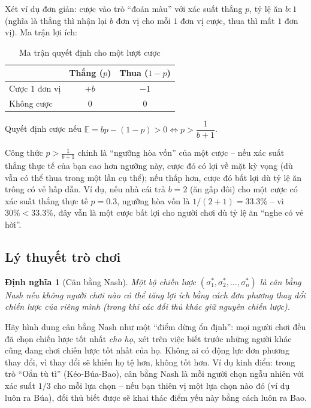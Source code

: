 \documentclass[12pt,a4paper]{article}
\theoremstyle{coloredthm}
\theoremstyle{coloreddef}
\newtheorem{definition}[theorem]{Định nghĩa}
\theoremstyle{remark}
\begin{document}
Xét ví dụ đơn giản: cược vào trò ``đoán màu'' với xác suất thắng $p$, tỷ lệ ăn $b:1$ (nghĩa là thắng thì nhận lại $b$ đơn vị cho mỗi $1$ đơn vị cược, thua thì mất $1$ đơn vị). Ma trận lợi ích:

\begin{table}[H]
\centering
\caption{Ma trận quyết định cho một lượt cược}
\begin{tabular}{lcc}
\toprule
 & \textbf{Thắng ($p$)} & \textbf{Thua ($1-p$)} \\
\midrule
Cược $1$ đơn vị & $+b$ & $-1$ \\
Không cược      & $0$  & $0$ \\
\bottomrule
\end{tabular}
\end{table}

Quyết định cược nếu $\mathbb{E} = bp - (1-p) > 0 \iff p > \dfrac{1}{b+1}$.

\begin{giaithich}
Công thức $p > \frac{1}{b+1}$ chính là ``ngưỡng hòa vốn'' của một cược -- nếu xác suất thắng thực tế của bạn cao hơn ngưỡng này, cược đó có lợi về mặt kỳ vọng (dù vẫn có thể thua trong một lần cụ thể); nếu thấp hơn, cược đó bất lợi dù tỷ lệ ăn trông có vẻ hấp dẫn. Ví dụ, nếu nhà cái trả $b=2$ (ăn gấp đôi) cho một cược có xác suất thắng thực tế $p=0.3$, ngưỡng hòa vốn là $1/(2+1)=33.3\%$ -- vì $30\% < 33.3\%$, đây vẫn là một cược bất lợi cho người chơi dù tỷ lệ ăn ``nghe có vẻ hời''.
\end{giaithich}

\subsection{Lý thuyết trò chơi}

\begin{definition}[Cân bằng Nash]
Một bộ chiến lược $(\sigma_1^*, \sigma_2^*, \dots, \sigma_n^*)$ là cân bằng Nash nếu không người chơi nào có thể tăng lợi ích bằng cách đơn phương thay đổi chiến lược của riêng mình (trong khi các đối thủ khác giữ nguyên chiến lược).
\end{definition}

\begin{giaithich}
Hãy hình dung cân bằng Nash như một ``điểm dừng ổn định'': mọi người chơi đều đã chọn chiến lược tốt nhất \emph{cho họ}, xét trên việc biết trước những người khác cũng đang chơi chiến lược tốt nhất của họ. Không ai có động lực đơn phương thay đổi, vì thay đổi sẽ khiến họ tệ hơn, không tốt hơn. Ví dụ kinh điển: trong trò ``Oẳn tù tì'' (Kéo-Búa-Bao), cân bằng Nash là mỗi người chọn ngẫu nhiên với xác suất $1/3$ cho mỗi lựa chọn -- nếu bạn thiên vị một lựa chọn nào đó (ví dụ luôn ra Búa), đối thủ biết được sẽ khai thác điểm yếu này bằng cách luôn ra Bao.
\end{giaithich}
\end{document}
